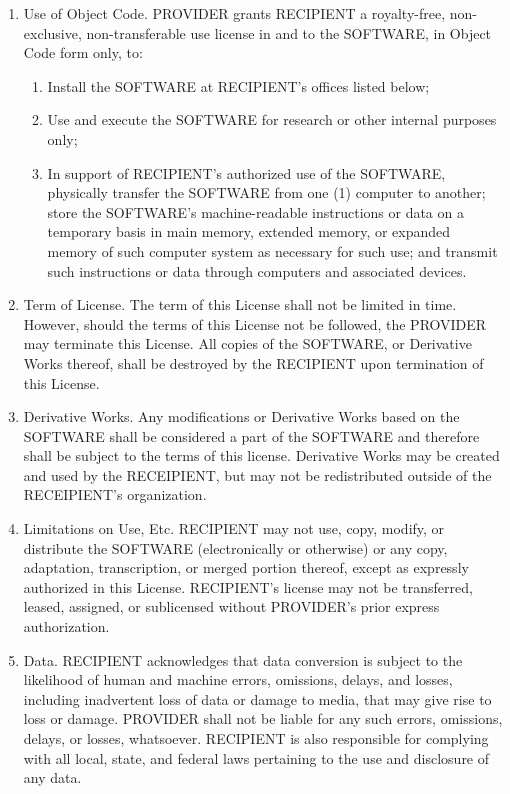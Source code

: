 \begin{enumerate}
\item Use of Object Code.  PROVIDER grants RECIPIENT a royalty-free,
non-exclusive, non-transferable use license in and to the SOFTWARE, in
Object Code form only, to: 
  \begin{enumerate}
  \item Install the SOFTWARE at RECIPIENT's offices listed below;
  \item Use and execute the SOFTWARE for research or other internal
  purposes only;
  \item In support of RECIPIENT's authorized use of the SOFTWARE,
  physically transfer the SOFTWARE from one (1) computer to another;
  store the SOFTWARE's machine-readable instructions or data on a
  temporary basis in main memory, extended memory, or expanded memory
  of such computer system as necessary for such use; and transmit such
  instructions or data through computers and associated devices.
  \end{enumerate}


\item Term of License.  The term of this License shall not be limited in
time.  However, should the terms of this License not be followed, the
PROVIDER may terminate this License.  All copies of the SOFTWARE, or
Derivative Works thereof, shall be destroyed by the RECIPIENT upon
termination of this License.   

\item Derivative Works.  
Any modifications
or Derivative Works based on the SOFTWARE shall be considered a part
of the SOFTWARE and therefore shall be subject to the terms of
this license.  Derivative Works may be created and used by the
RECEIPIENT, but may not be redistributed outside of the 
RECEIPIENT's organization.

\item Limitations on Use, Etc.  RECIPIENT may not use, copy, modify,
or distribute the SOFTWARE (electronically or otherwise) or any copy,
adaptation, transcription, or merged portion thereof, except as
expressly authorized in this License.  RECIPIENT's license may not
be transferred, leased, assigned, or sublicensed without PROVIDER's
prior express authorization. 

\item Data.  RECIPIENT acknowledges that data conversion is subject to
the likelihood of human and machine errors, omissions, delays, and
losses, including inadvertent loss of data or damage to media, that
may give rise to loss or damage.  PROVIDER shall not be liable for any
such errors, omissions, delays, or losses, whatsoever.  RECIPIENT is
also responsible for complying with all local, state, and federal laws
pertaining to the use and disclosure of any data.


\end{enumerate}
